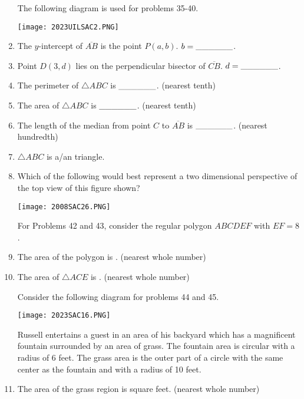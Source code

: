 \documentclass[../uilmath.tex]{subfiles}
\begin{document}
\begin{enumerate}[label=\bfseries\arabic*.]
    The following diagram is used for problems 35-40.
    \begin{center}
        \texttt{[image: 2023UILSAC2.PNG]}
    \end{center}
    \item %
    The $y$-intercept of $\overline{AB}$ is the point $P(a,b)$. $b=\_\_\_\_\_\_$.

    \item %
    Point $D(3,d)$ lies on the perpendicular bisector of $\overline{CB}$. $d=\_\_\_\_\_\_$.

    \item %
    The perimeter of $\triangle ABC$ is $\_\_\_\_\_\_$. (nearest tenth)

    \item %
    The area of $\triangle ABC$ is $\_\_\_\_\_\_$. (nearest tenth)

    \item %
    The length of the median from point $C$ to $\overline{AB}$ is $\_\_\_\_\_\_$. (nearest hundredth)

    \item %
    $\triangle ABC$ is a/an \blank triangle.

    \item %
    Which of the following would best represent a two dimensional perspective of the top view of this figure shown?
    \begin{center}
        \texttt{[image: 2008SAC26.PNG]}
    \end{center}

    
    For Problems 42 and 43, consider the regular polygon $ABCDEF$ with $EF=8$.
    \item %
    The area of the polygon is \blank. (nearest whole number)

    \item %
    The area of $\triangle ACE$ is \blank. (nearest whole number)

    
    Consider the following diagram for problems 44 and 45.
    \begin{center}
        \texttt{[image: 2023SAC16.PNG]}
    \end{center}
    Russell entertains a guest in an area of his backyard which has a magnificent fountain surrounded by an area of grass.
    The fountain area is circular with a radius of 6 feet. The grass area is the outer part of a circle with the same 
    center as the fountain and with a radius of 10 feet.
    \item %
    The area of the grass region is \blank square feet. (nearest whole number)


\end{enumerate}
\end{document}
